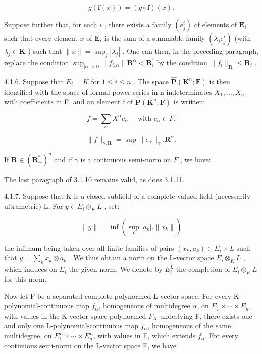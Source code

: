 \[
g (\mathbf {f} (x)) = (g \circ \mathbf {f}) (x).
\]

Suppose further that, for each \(i\) , there exists a family \((e_{j}^{i})\) of elements of \(\mathbf{E}_{i}\) such that every element \(x\) of \(\mathbf{E}_{i}\) is the sum of a summable family \((\lambda_{j}e_{j}^{i})\) (with \(\lambda_{j}\in\mathbf{K}\) ) such that \(\|x\|=\sup_{j}|\lambda_{j}|\) . One can then, in the preceding paragraph, replace the condition \(\sup_{|\alpha|>0}\|f_{i,\alpha}\|\mathbf{R}^{\alpha}<\mathbf{R}_{i}^{\prime}\) by the condition \(\|f_{i}\|_{\mathbf{R}}\leqslant\mathbf{R}_{i}^{\prime}\) .

4.1.6. Suppose that \(E_{i} = K\) for \(1 \leqslant i \leqslant n\) . The space \(\hat{\mathbf{P}}(\mathbf{K}^{n}; \mathbf{F})\) is then identified with the space of formal power series in n indeterminates \(X_{1}, \ldots, X_{n}\) with coefficients in F, and an element f of \(\hat{\mathbf{P}}(\mathbf{K}^{n}; \mathbf{F})\) is written:

\[
f = \sum_ {\alpha} X ^ {\alpha} c _ {\alpha} \quad \text { with } c _ {\alpha} \in F.
\]

\[
\| f \| _ {\gamma , \mathbf {R}} = \sup \| c _ {\alpha} \| _ {\gamma}. \mathbf {R} ^ {\alpha}.
\]

If \(\mathbf{R} \in (\mathbf{R}_{+}^{*})^{n}\) and if \(\gamma\) is a continuous semi-norm on \(F\) , we have:

The last paragraph of 3.1.10 remains valid, as does 3.1.11.

4.1.7. Suppose that K is a closed subfield of a complete valued field (necessarily ultrametric) L. For \(y \in E_{i} \otimes_{K} L\) , set:

\[
\| y \| = \inf (\sup _ {k} | a _ {k} |. \| x _ {k} \|)
\]

the infimum being taken over all finite families of pairs \((x_{k}, a_{k}) \in E_{i} \times L\) such that \(y = \sum_{k} x_{k} \otimes a_{k}\) . We thus obtain a norm on the L-vector space \(E_{i} \otimes_{K} L\) , which induces on \(E_{i}\) the given norm. We denote by \(E_{i}^{L}\) the completion of \(E_{i} \otimes_{K} L\) for this norm.

Now let F be a separated complete polynormed L-vector space. For every K-polynomial-continuous map \(f_{\alpha}\), homogeneous of multidegree \(\alpha\), on \(E_1 \times \cdots \times E_n\), with values in the K-vector space polynormed \(F_K\) underlying F, there exists one and only one L-polynomial-continuous map \(\tilde{f}_{\alpha}\), homogeneous of the same multidegree, on \(E_1^L \times \cdots \times E_n^L\), with values in F, which extends \(f_{\alpha}\). For every continuous semi-norm on the L-vector space F, we have

